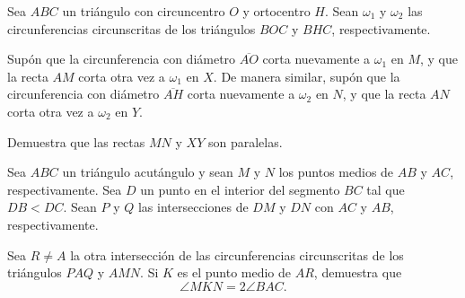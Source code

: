 \documentclass[11pt]{scrartcl}
\begin{document}
\begin{problem} %
    Sea $ABC$ un triángulo con circuncentro $O$ y ortocentro $H$. Sean $\omega_1$ y $\omega_2$ las circunferencias circunscritas de los triángulos $BOC$ y $BHC$, respectivamente. 

Supón que la circunferencia con diámetro $\overline{AO}$ corta nuevamente a $\omega_1$ en $M$, y que la recta $AM$ corta otra vez a $\omega_1$ en $X$. De manera similar, supón que la circunferencia con diámetro $\overline{AH}$ corta nuevamente a $\omega_2$ en $N$, y que la recta $AN$ corta otra vez a $\omega_2$ en $Y$.

Demuestra que las rectas $MN$ y $XY$ son paralelas.
\end{problem}

\begin{problem} %
    Sea $ABC$ un triángulo acutángulo y sean $M$ y $N$ los puntos medios de $AB$ y $AC$, respectivamente. Sea $D$ un punto en el interior del segmento $BC$ tal que $DB<DC$. Sean $P$ y $Q$ las intersecciones de $DM$ y $DN$ con $AC$ y $AB$, respectivamente. 

Sea $R \ne A$ la otra intersección de las circunferencias circunscritas de los triángulos $PAQ$ y $AMN$. Si $K$ es el punto medio de $AR$, demuestra que
\[
\angle MKN = 2\angle BAC.
\]
\end{problem}
\end{document}
